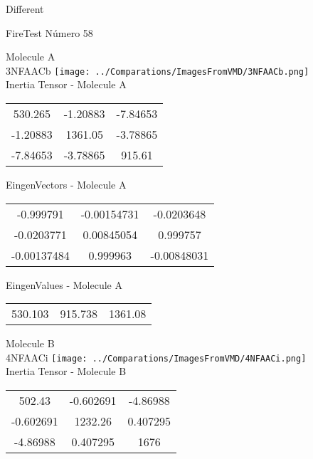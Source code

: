 \begin{center}
\vtab
\vtab
\textcolor{NavyBlue}{\Large Different}
\end{center}

 \newpage

\vtab[-2cm]
\begin{center}
{\large FireTest \tab Número 58}
\end{center}
\begin{multicols}{2}
\begin{center}

Molecule A \\ 
3NFAACb
\texttt{[image: ../Comparations/ImagesFromVMD/3NFAACb.png]}
\\
Inertia Tensor - Molecule A \\
\vtab

\begin{tabular}{|c c c|}
530.265	 & 	-1.20883	 & 	-7.84653	 \\
-1.20883	 & 	1361.05	 & 	-3.78865	 \\
-7.84653	 & 	-3.78865	 & 	915.61
\end{tabular}

\vtab
 EingenVectors - Molecule A     \\
\vtab
\begin{tabular}{|c c c|}
-0.999791	 & 	-0.00154731	 & 	-0.0203648	 \\
-0.0203771	 & 	0.00845054	 & 	0.999757	 \\
-0.00137484	 & 	0.999963	 & 	-0.00848031
\end{tabular}

\vtab
 EingenValues - Molecule A     \\
\vtab
\begin{tabular}{|c c c|}
530.103	 & 	915.738	 & 	1361.08	 \\
\end{tabular}
\columnbreak

Molecule B \\ 
4NFAACi
\texttt{[image: ../Comparations/ImagesFromVMD/4NFAACi.png]}
\\
Inertia Tensor - Molecule B \\
\vtab

\begin{tabular}{|c c c|}
502.43	 & 	-0.602691	 & 	-4.86988	 \\
-0.602691	 & 	1232.26	 & 	0.407295	 \\
-4.86988	 & 	0.407295	 & 	1676
\end{tabular}


\end{center}
\end{multicols}
